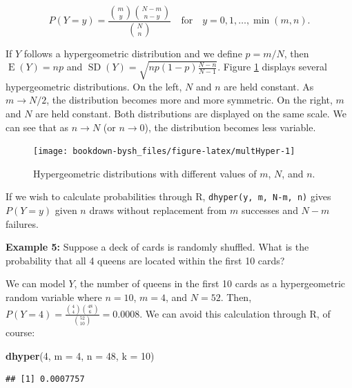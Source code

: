 \documentclass[
]{krantz}
\newenvironment{Shaded}{\begin{snugshade}}{\end{snugshade}}
\newcommand{\DataTypeTok}[1]{\textcolor[rgb]{0.27,0.27,0.27}{#1}}
\newcommand{\DecValTok}[1]{\textcolor[rgb]{0.06,0.06,0.06}{#1}}
\newcommand{\KeywordTok}[1]{\textcolor[rgb]{0.27,0.27,0.27}{\textbf{#1}}}
\newcommand{\NormalTok}[1]{#1}
\newcommand{\E}{\operatorname{E}}
\newcommand{\SD}{\operatorname{SD}}
\begin{document}
\begin{equation}
P(Y=y) = \frac{\binom{m}{y} \binom{N-m}{n-y}}{\binom{N}{n}} \quad \textrm{for} \quad y = 0, 1, \ldots, \min(m,n).
\label{eq:hyperGeoRV}
\end{equation}

If \(Y\) follows a hypergeometric distribution and we define \(p = m/N\), then \(\E(Y) = np\) and \(\SD(Y) = \sqrt{np(1-p)\frac{N-n}{N-1}}\). Figure \ref{fig:multHyper} displays several hypergeometric distributions. On the left, \(N\) and \(n\) are held constant. As \(m \rightarrow N/2\), the distribution becomes more and more symmetric. On the right, \(m\) and \(N\) are held constant. Both distributions are displayed on the same scale. We can see that as \(n \rightarrow N\) (or \(n \rightarrow 0\)), the distribution becomes less variable.



\begin{figure}

{\centering \texttt{[image: bookdown-bysh\_files/figure-latex/multHyper-1]} 

}

\caption{Hypergeometric distributions with different values of \(m\), \(N\), and \(n\).}\label{fig:multHyper}
\end{figure}

If we wish to calculate probabilities through R, \texttt{dhyper(y,\ m,\ N-m,\ n)} gives \(P(Y=y)\) given \(n\) draws without replacement from \(m\) successes and \(N-m\) failures.

\textbf{Example 5:} Suppose a deck of cards is randomly shuffled. What is the probability that all 4 queens are located within the first 10 cards?

We can model \(Y\), the number of queens in the first 10 cards as a hypergeometric random variable where \(n = 10\), \(m = 4\), and \(N = 52\). Then, \(P(Y=4) = \displaystyle \frac{\binom{4}{4}\binom{48}{6}}{\binom{52}{10}} = 0.0008\). We can avoid this calculation through R, of course:

\begin{Shaded}
\begin{Highlighting}[]
\KeywordTok{dhyper}\NormalTok{(}\DecValTok{4}\NormalTok{, }\DataTypeTok{m =} \DecValTok{4}\NormalTok{, }\DataTypeTok{n =} \DecValTok{48}\NormalTok{, }\DataTypeTok{k =} \DecValTok{10}\NormalTok{)}
\end{Highlighting}
\end{Shaded}

\begin{verbatim}
## [1] 0.0007757
\end{verbatim}
\end{document}
